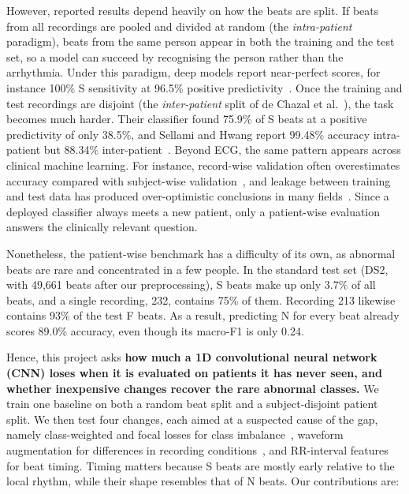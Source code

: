 \documentclass[10pt,a4paper]{article}
\begin{document}
However, reported results depend heavily on how the beats are split. If beats from all recordings are pooled and divided at random (the \emph{intra-patient} paradigm), beats from the same person appear in both the training and the test set, so a model can succeed by recognising the person rather than the arrhythmia. Under this paradigm, deep models report near-perfect scores, for instance 100\% S sensitivity at 96.5\% positive predictivity~\cite{Mousavi2019}. Once the training and test recordings are disjoint (the \emph{inter-patient} split of de Chazal et al.~\cite{dechazal2004automatic}), the task becomes much harder. Their classifier found 75.9\% of S beats at a positive predictivity of only 38.5\%, and Sellami and Hwang report 99.48\% accuracy intra-patient but 88.34\% inter-patient~\cite{Sellami2019}. Beyond ECG, the same pattern appears across clinical machine learning. For instance, record-wise validation often overestimates accuracy compared with subject-wise validation~\cite{Saeb2017}, and leakage between training and test data has produced over-optimistic conclusions in many fields~\cite{Kapoor2023}. Since a deployed classifier always meets a new patient, only a patient-wise evaluation answers the clinically relevant question.

Nonetheless, the patient-wise benchmark has a difficulty of its own, as abnormal beats are rare and concentrated in a few people. In the standard test set (DS2, with 49,661 beats after our preprocessing), S beats make up only 3.7\% of all beats, and a single recording, 232, contains 75\% of them. Recording 213 likewise contains 93\% of the test F beats. As a result, predicting N for every beat already scores 89.0\% accuracy, even though its macro-F1 is only 0.24.

Hence, this project asks \textbf{how much a 1D convolutional neural network (CNN) loses when it is evaluated on patients it has never seen, and whether inexpensive changes recover the rare abnormal classes.} We train one baseline on both a random beat split and a subject-disjoint patient split. We then test four changes, each aimed at a suspected cause of the gap, namely class-weighted and focal losses for class imbalance~\cite{Cui2019,Lin2017}, waveform augmentation for differences in recording conditions~\cite{Um2017,Iwana2021}, and RR-interval features for beat timing. Timing matters because S beats are mostly early relative to the local rhythm, while their shape resembles that of N beats. Our contributions are:
\end{document}

